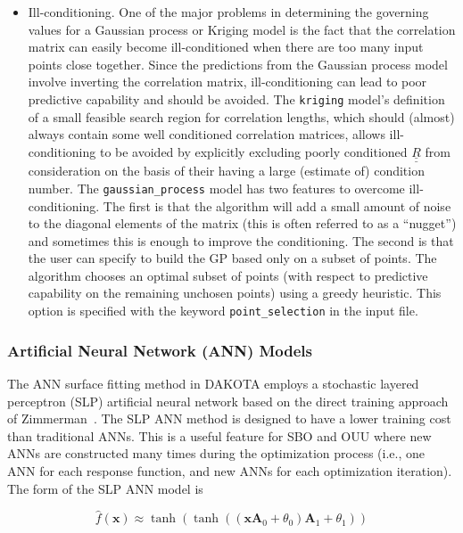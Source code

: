\begin{itemize}
\item Ill-conditioning.  One of the major problems in determining 
the governing values for a Gaussian process or Kriging model is the fact 
that the correlation matrix can easily become ill-conditioned when there 
are too many input points close together.  Since the predictions from 
the Gaussian process model involve inverting the correlation matrix, 
ill-conditioning can lead to poor predictive capability and should be 
avoided. The \texttt{kriging} model's definition of a small feasible search 
region for correlation lengths, which should (almost) always contain some well 
conditioned correlation matrices, allows ill-conditioning to be avoided by 
explicitly excluding poorly conditioned $\underline{\underline{R}}$ from 
consideration on the basis of their having a large (estimate of) condition 
number.  The \texttt{gaussian\_process} model has two features to overcome
ill-conditioning.  The first is that the algorithm will add a small amount 
of noise to the diagonal elements of the matrix (this is often referred to 
as a ``nugget'') and sometimes this is enough to improve the conditioning. 
The second is that the user can specify to build the GP based only on a subset 
of points.  The algorithm chooses an optimal subset of points (with 
respect to predictive capability on the remaining unchosen points) using a 
greedy heuristic. This option is specified with the keyword 
\texttt{point\_selection} in the input file.  

\end{itemize}

\subsubsection{Artificial Neural Network (ANN) Models}\label{models:surf:ann}

The ANN surface fitting method in DAKOTA employs a stochastic layered
perceptron (SLP) artificial neural network based on the direct
training approach of Zimmerman~\cite{Zim96}. The SLP ANN method is
designed to have a lower training cost than traditional ANNs. This is
a useful feature for SBO and OUU where new ANNs are constructed many
times during the optimization process (i.e., one ANN for each response
function, and new ANNs for each optimization iteration). The form of
the SLP ANN model is

\begin{equation}
  \hat{f}(\mathbf{x}) \approx
  \tanh(\tanh((\mathbf{x A}_{0}+\theta_{0})\mathbf{A}_{1}+\theta_{1}))
  \label{models:surf:equation09}
\end{equation}

